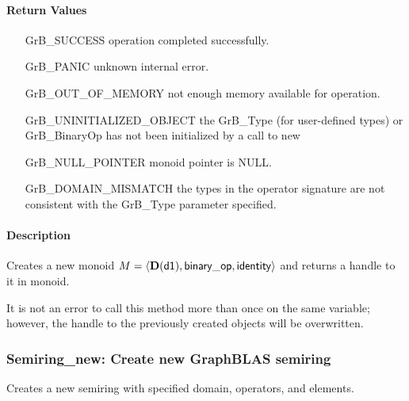 \paragraph{Return Values}

\begin{itemize}[leftmargin=2.1in]
\item[{\sf GrB\_SUCCESS}]           operation completed successfully.
\item[{\sf GrB\_PANIC}]             unknown internal error.
\item[{\sf GrB\_OUT\_OF\_MEMORY}]          not enough memory available for operation.
\item[{\sf GrB\_UNINITIALIZED\_OBJECT}]          the {\sf GrB\_Type} (for user-defined types)
                                    or {\sf GrB\_BinaryOp} has not been
                                    initialized by a call to {\sf new}
\item[{\sf GrB\_NULL\_POINTER}]    {\sf monoid} pointer is {\sf NULL}.
\item[{\sf GrB\_DOMAIN\_MISMATCH}]  the types in the operator signature are not   
                                    consistent with the {\sf GrB\_Type} parameter specified.
\end{itemize}

\paragraph{Description}

Creates a new monoid $M = \langle \bold{D}({\sf d1}), {\sf binary\_op}, 
{\sf identity} \rangle$ and returns a handle to it in {\sf monoid}.

It is not an error to call this method more than once on the same variable;  
however, the handle to the previously created objects will be overwritten. 

\subsubsection{{\sf Semiring\_new}: Create new GraphBLAS semiring}

Creates a new semiring with specified domain, operators, and elements.

\paragraph{\syntax}

